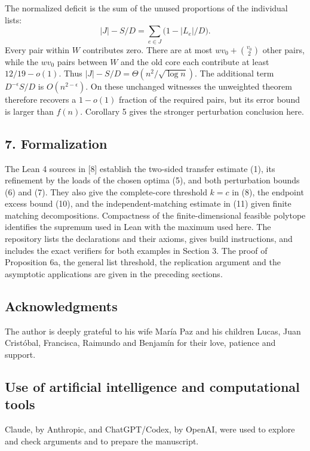 \documentclass[english,11pt,a4paper]{article}
\begin{document}
The normalized deficit is the sum of the unused proportions of the individual lists: \[
|J|-S/D=\sum_{e\in J}\bigl(1-|L_e|/D\bigr).
\] Every pair within \(W\) contributes zero. There are at most \(wv_0+\binom{v_0}{2}\) other pairs, while the \(wv_0\) pairs between \(W\) and the old core each contribute at least \(12/19-o(1)\). Thus \(|J|-S/D=\Theta(n^2/\sqrt{\log n})\). The additional term \(D^{-\epsilon}S/D\) is \(O(n^{2-\epsilon})\). On these unchanged witnesses the unweighted theorem therefore recovers a \(1-o(1)\) fraction of the required pairs, but its error bound is larger than \(f(n)\). Corollary 5 gives the stronger perturbation conclusion here.

\subsection{7. Formalization}\label{formalization}

The Lean 4 sources in {[}8{]} establish the two-sided transfer estimate (1), its refinement by the loads of the chosen optima (5), and both perturbation bounds (6) and (7). They also give the complete-core threshold \(k=c\) in (8), the endpoint excess bound (10), and the independent-matching estimate in (11) given finite matching decompositions. Compactness of the finite-dimensional feasible polytope identifies the supremum used in Lean with the maximum used here. The repository lists the declarations and their axioms, gives build instructions, and includes the exact verifiers for both examples in Section 3. The proof of Proposition 6a, the general list threshold, the replication argument and the asymptotic applications are given in the preceding sections.

\subsection{Acknowledgments}\label{acknowledgments}

The author is deeply grateful to his wife María Paz and his children Lucas, Juan Cristóbal, Francisca, Raimundo and Benjamín for their love, patience and support.

\subsection{Use of artificial intelligence and computational tools}\label{use-of-artificial-intelligence-and-computational-tools}

Claude, by Anthropic, and ChatGPT/Codex, by OpenAI, were used to explore and check arguments and to prepare the manuscript.
\end{document}
